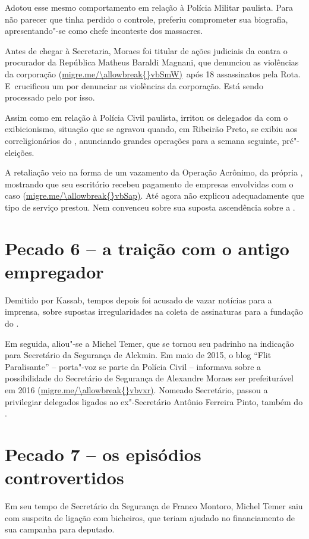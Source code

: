 Adotou esse mesmo comportamento em relação à Polícia Militar paulista.
Para não parecer que tinha perdido o controle, preferiu comprometer sua
biografia, apresentando"-se como chefe inconteste dos massacres.

Antes de chegar à Secretaria, Moraes foi titular de ações judiciais da
 contra o procurador da República Matheus Baraldi Magnani, que
denunciou as violências da corporação (\url{migre.me/\allowbreak{}vbSmW)}~após
18 assassinatos pela Rota. E~crucificou um  por denunciar as
violências da corporação. Está sendo processado pelo  por isso.

Assim como em relação à Polícia Civil paulista, irritou os delegados da
 com o exibicionismo, situação que se agravou quando, em Ribeirão
Preto, se exibiu aos correligionários do , anunciando grandes
operações para a semana seguinte, pré"-eleições.

A retaliação veio na forma de um vazamento da Operação Acrônimo, da
própria , mostrando que seu escritório recebeu pagamento de empresas
envolvidas com o caso (\url{migre.me/\allowbreak{}vbSap)}. Até agora não
explicou adequadamente que tipo de serviço prestou. Nem convenceu sobre
sua suposta ascendência sobre a .

\section{Pecado 6 -- a traição com o antigo empregador}

Demitido por Kassab, tempos depois foi acusado de vazar notícias para a
imprensa, sobre supostas irregularidades na coleta de assinaturas para a
fundação do .

Em seguida, aliou"-se a Michel Temer, que se tornou seu padrinho na
indicação para Secretário da Segurança de Alckmin. Em maio de 2015, o
blog ``Flit Paralisante'' -- porta"-voz se parte da Polícia Civil --
informava sobre a possibilidade do Secretário de Segurança de Alexandre
Moraes ser prefeiturável em 2016 (\url{migre.me/\allowbreak{}vbvxr)}. Nomeado
Secretário, passou a privilegiar delegados ligados ao ex"-Secretário
Antônio Ferreira Pinto, também do .

\section{Pecado 7 -- os episódios controvertidos}

Em seu tempo de Secretário da Segurança de Franco Montoro, Michel Temer
saiu com suspeita de ligação com bicheiros, que teriam ajudado no
financiamento de sua campanha para deputado.

